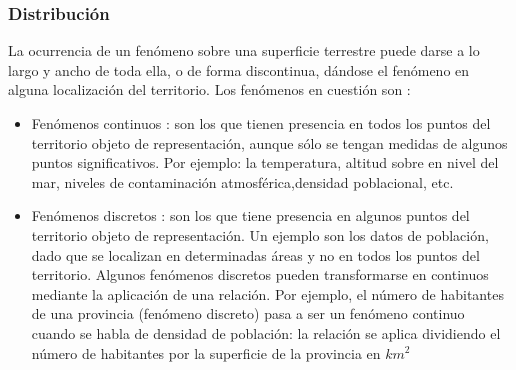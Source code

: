 \subsubsection{Distribución}
La ocurrencia de un fenómeno sobre una superficie terrestre puede darse a lo largo y ancho de toda
ella, o de forma discontinua, dándose el fenómeno en alguna localización del territorio. Los
fenómenos en cuestión son :

\begin{itemize}
    \item Fenómenos continuos :  son los que tienen presencia en todos los puntos del territorio objeto de representación, aunque sólo se tengan medidas de algunos puntos significativos. Por ejemplo: la temperatura, altitud sobre en nivel del mar, niveles de contaminación atmosférica,densidad poblacional, etc.

    \item Fenómenos discretos : son los que tiene presencia en algunos puntos del territorio objeto de representación. Un ejemplo son los datos de población, dado que se localizan en determinadas áreas y no en todos los puntos del territorio. Algunos fenómenos discretos pueden transformarse en continuos mediante la aplicación de una relación. Por ejemplo, el número de habitantes de una provincia (fenómeno discreto) pasa a ser un fenómeno continuo cuando se habla de densidad de población: la relación se aplica dividiendo el número de habitantes por la superficie de la provincia en $km^2$
\end{itemize}
